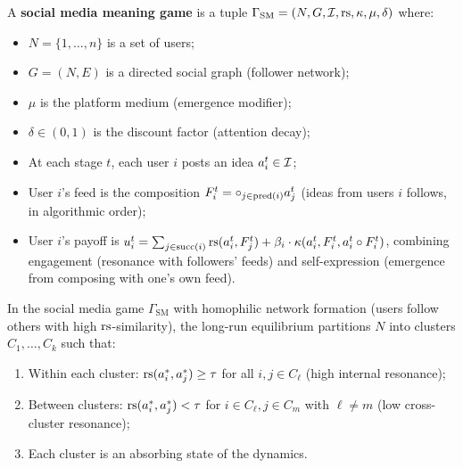 \begin{definition}
\label{def:social-media}
A \textbf{social media meaning game} is a tuple
$\Gamma_{\mathrm{SM}} = (N, G, \mathcal{I}, \mathrm{rs}, \kappa, \mu, \delta)$ where:
\begin{itemize}
  \item $N = \{1,\ldots,n\}$ is a set of users;
  \item $G = (N, E)$ is a directed social graph (follower network);
  \item $\mu$ is the platform medium (emergence modifier);
  \item $\delta \in (0,1)$ is the discount factor (attention decay);
  \item At each stage $t$, each user $i$ posts an idea $a_i^t \in \mathcal{I}$;
  \item User $i$'s feed is the composition
    $F_i^t = \circ_{j \in \mathrm{pred}(i)} a_j^t$ (ideas from
    users $i$ follows, in algorithmic order);
  \item User $i$'s payoff is
    $u_i^t = \sum_{j \in \mathrm{succ}(i)} \mathrm{rs}(a_i^t, F_j^t)
    + \beta_i \cdot \kappa(a_i^t, F_i^t, a_i^t \circ F_i^t)$,
    combining engagement (resonance with followers' feeds)
    and self-expression (emergence from composing with one's own feed).
\end{itemize}
\end{definition}

\begin{theorem}
\label{thm:echo-chamber}
In the social media game $\Gamma_{\mathrm{SM}}$ with homophilic
network formation (users follow others with high $\mathrm{rs}$-similarity),
the long-run equilibrium partitions $N$ into clusters
$C_1, \ldots, C_k$ such that:
\begin{enumerate}[label=(\roman*)]
  \item Within each cluster: $\mathrm{rs}(a_i^*, a_j^*) \ge \tau$ for
    all $i, j \in C_\ell$ (high internal resonance);
  \item Between clusters: $\mathrm{rs}(a_i^*, a_j^*) < \tau$ for $i \in C_\ell,
    j \in C_m$ with $\ell \ne m$ (low cross-cluster resonance);
  \item Each cluster is an absorbing state of the dynamics.
\end{enumerate}
\end{theorem}

